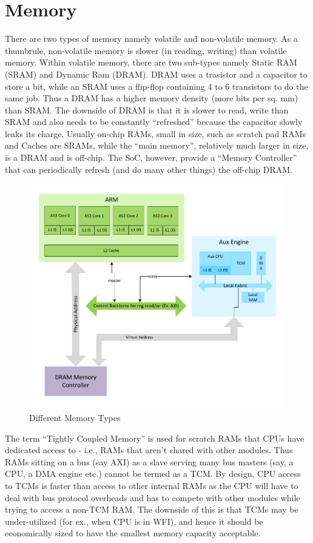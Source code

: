 \section{Memory}
There are two types of memory namely volatile and non-volatile memory. As a thumbrule, non-volatile memory is slower (in reading, writing) than volatile memory. Within volatile memory, there are two sub-types namely Static RAM (SRAM) and Dynamic Ram (DRAM).  DRAM uses a trasistor and a capacitor to store a bit, while an SRAM uses a flip-flop containing 4 to 6 transistors to do the same job. Thus a DRAM has a higher memory density (more bits per sq. mm) than SRAM. The downside of DRAM is that it is slower to read, write than SRAM  and also needs to be constantly ``refreshed'' because the capacitor slowly leaks its charge. Usually on-chip RAMs, small in size, such as scratch pad RAMs and Caches are SRAMs, while the ``main memory'', relatively much larger in size, is a DRAM and is off-chip. The SoC, however, provide a ``Memory Controller'' that can periodically refresh (and do many other things) the off-chip DRAM. 

	\begin{figure}[h!]
	\centering
	\includegraphics[width = \textwidth]{partHW/Memory}
	\caption{Different Memory Types}
	\label{fig:mem}
	\end{figure}
	
The term ``Tightly Coupled Memory'' is used for scratch RAMs that CPUs have dedicated access to - i.e., RAMs that aren't shared with other modules. Thus RAMs sitting on a bus (say AXI) as a slave serving many bus masters (say, a CPU, a DMA engine etc.) cannot be termed as a TCM. By design, CPU access to TCMs is faster than access to other internal RAMs as the CPU will have to deal with bus protocol overheads and has to compete with other modules while trying to access a non-TCM RAM. The downside of this is that TCMs may be under-utilized (for ex., when CPU is in WFI), and hence it should be economically sized to have the smallest memory capacity acceptable.

